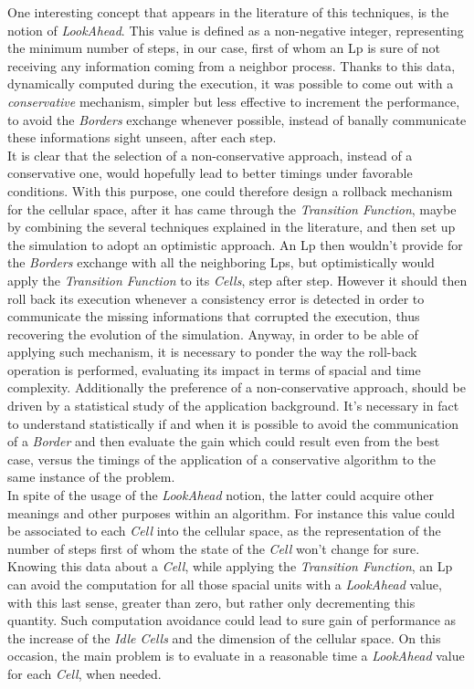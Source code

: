 \documentclass[12pt,a4paper,fleqn]{report}
\begin{document}
 One interesting concept that appears in the literature of this techniques, is the notion of \textit{LookAhead}. This value is defined as a non-negative integer, representing the minimum number of steps, in our case, first of whom an Lp is sure of not receiving any information coming from a neighbor process. Thanks to this data, dynamically computed during the execution, it was possible to come out with a \textit{conservative} mechanism, simpler but less effective to increment the performance, to avoid the \textit{Borders} exchange whenever possible, instead of banally communicate these informations sight unseen, after each step.\\
 It is clear that the selection of a non-conservative approach, instead of a conservative one, would hopefully lead to better timings under favorable conditions. With this purpose, one could therefore design a rollback mechanism for the cellular space, after it has came through the \textit{Transition Function}, maybe by combining the several techniques explained in the literature, and then set up the simulation to adopt an optimistic approach. An Lp then wouldn't provide for the \textit{Borders} exchange with all the neighboring Lps, but optimistically would apply the \textit{Transition Function} to its \textit{Cells}, step after step. However it should then roll back its execution whenever a consistency error is detected in order to communicate the missing informations that corrupted the execution, thus recovering the evolution of the simulation. Anyway, in order to be able of applying such mechanism, it is necessary to ponder the way the roll-back operation is performed, evaluating its impact in terms of spacial and time complexity. Additionally the preference of a non-conservative approach, should be driven by a statistical study of the application background. It's necessary in fact to understand statistically if and when it is possible to avoid the communication of a \textit{Border} and then evaluate the gain which could result even from the best case, versus the timings of the application of a conservative algorithm to the same instance of the problem. \\
 In spite of the usage of the \textit{LookAhead} notion, the latter could acquire other meanings and other purposes within an algorithm. For instance this value could be associated to each \textit{Cell} into the cellular space, as the representation of the number of steps first of whom the state of the \textit{Cell} won't change for sure. Knowing this data about a \textit{Cell}, while applying the \textit{Transition Function}, an Lp can avoid the computation for all those spacial units with a \textit{LookAhead} value, with this last sense,  greater than zero, but rather only decrementing this quantity. Such computation avoidance could lead to sure gain of performance as the increase of the \textit{Idle Cells} and the dimension of the cellular space. On this occasion, the main problem is to evaluate in a reasonable time a \textit{LookAhead} value for each \textit{Cell}, when needed.\\
\end{document}
